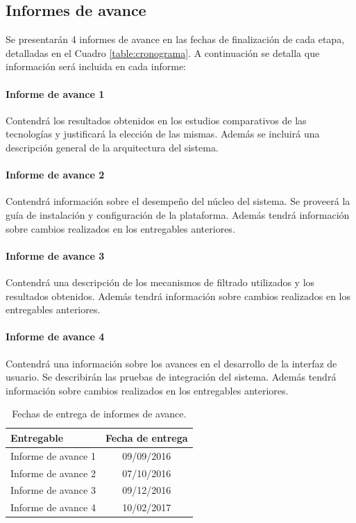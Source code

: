 \subsection*{Informes de avance}

Se presentarán 4 informes de avance en las fechas de finalización de cada etapa, detalladas en el Cuadro \ref{table:cronograma}. A continuación se detalla que información será incluida en cada informe:

\paragraph{Informe de avance 1} 
Contendrá los resultados obtenidos en los estudios comparativos de las tecnologías y justificará la elección de las mismas. Además se incluirá una descripción general de la arquitectura del sistema.

\paragraph{Informe de avance 2}
Contendrá información sobre el desempeño del núcleo del sistema. Se proveerá la guía de instalación y configuración de la plataforma. Además tendrá información sobre cambios realizados en los entregables anteriores.

\paragraph{Informe de avance 3}
Contendrá una descripción de los mecanismos de filtrado utilizados y los resultados obtenidos. Además tendrá información sobre cambios realizados en los entregables anteriores.

\paragraph{Informe de avance 4}
Contendrá una información sobre los avances en el desarrollo de la interfaz de usuario. Se describirán las pruebas de integración del sistema. Además tendrá información sobre cambios realizados en los entregables anteriores.

\begin{table}[htbp]
	\begin{center}	
		\begin{tabular}{|l|c|}
			\hline 
			Entregable & Fecha de entrega \\ \hline
			Informe de avance 1 & 09/09/2016 \\
			Informe de avance 2 & 07/10/2016 \\
			Informe de avance 3 & 09/12/2016 \\
			Informe de avance 4 & 10/02/2017 \\ \hline
		\end{tabular}
	\end{center}
	\caption{Fechas de entrega de informes de avance.}
	\label{table:informes}
\end{table}

